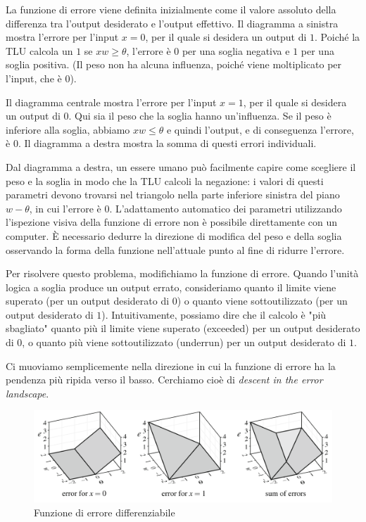 La funzione di errore viene definita inizialmente come il valore assoluto della differenza tra l'output desiderato e l'output effettivo. Il diagramma a sinistra mostra l'errore per l'input $x = 0$, per il quale si desidera un output di $1$. Poiché la TLU calcola un $1$ se $xw \geq \theta$, l'errore è $0$ per una soglia negativa e $1$ per una soglia positiva. (Il peso non ha alcuna influenza, poiché viene moltiplicato per l'input, che è $0$).

Il diagramma centrale mostra l'errore per l'input $x = 1$, per il quale si desidera un output di $0$. Qui sia il peso che la soglia hanno un'influenza. Se il peso è inferiore alla soglia, abbiamo $xw \leq \theta$ e quindi l'output, e di conseguenza l'errore, è $0$. Il diagramma a destra mostra la somma di questi errori individuali.

Dal diagramma a destra, un essere umano può facilmente capire come scegliere il peso e la soglia in modo che la TLU calcoli la negazione: i valori di questi parametri devono trovarsi nel triangolo nella parte inferiore sinistra del piano $w-\theta$, in cui l'errore è $0$. L'adattamento automatico dei parametri utilizzando l'ispezione visiva della funzione di errore non è possibile direttamente con un computer. È necessario dedurre la direzione di modifica del peso e della soglia osservando la forma della funzione nell'attuale punto al fine di ridurre l'errore.

Per risolvere questo problema, modifichiamo la funzione di errore. Quando l'unità logica a soglia produce un output errato, consideriamo quanto il limite viene superato (per un output desiderato di $0$) o quanto viene sottoutilizzato (per un output desiderato di $1$). Intuitivamente, possiamo dire che il calcolo è "più sbagliato" quanto più il limite viene superato (exceeded) per un output desiderato di $0$, o quanto più viene sottoutilizzato (underrun) per un output desiderato di $1$.

Ci muoviamo semplicemente nella direzione in cui la funzione di errore ha la pendenza più ripida verso il basso. Cerchiamo cioè di \textit{descent in the error landscape}.

\begin{figure}[h]
    \centering
    \includegraphics[scale=0.4]{images/error1.png}
    \caption{Funzione di errore differenziabile}
\end{figure}

